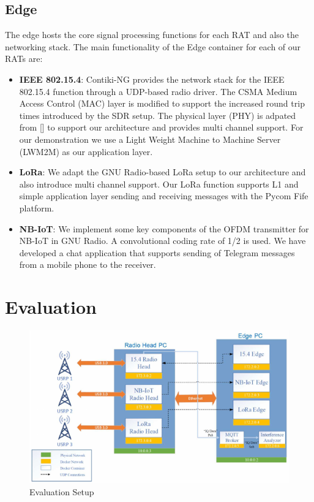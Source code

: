 \documentclass[10pt,emptycopyrightspace]{ewsn-proc}
\begin{document}
\subsection{Edge}
The edge hosts the core signal processing functions for each RAT and also the networking stack. The main functionality of the Edge container for each of our RATs are:
\begin{itemize}
	\item \textbf{IEEE 802.15.4}: Contiki-NG provides the network stack for the IEEE 802.15.4 function through a UDP-based radio driver. The CSMA Medium Access Control (MAC) layer is modified to support the increased round trip times introduced by the SDR setup. The physical layer (PHY) is adpated from [] to support our architecture and provides multi channel support. For our demonstration we use a Light Weight Machine to Machine Server (LWM2M) as our application layer. 		
	\item \textbf{LoRa}: We adapt the GNU Radio-based LoRa setup to our architecture and also introduce multi channel support. Our LoRa function supports L1 and simple application layer sending and receiving messages with the Pycom Fife platform.
	

	\item \textbf{NB-IoT}: We implement some key components of the OFDM transmitter for NB-IoT in GNU Radio. A convolutional coding rate of 1/2 is used. We have developed a chat application that supports sending of Telegram messages from a mobile phone to the receiver.
\end{itemize}


\section{Evaluation}

\begin{figure}[t]
  \vspace{-0.5cm}
  \centering
	\includegraphics[width= 0.42 \textwidth]{setup-alt.png}
	\caption{Evaluation Setup}
	\label{fig:setup}
\end{figure}
\end{document}
